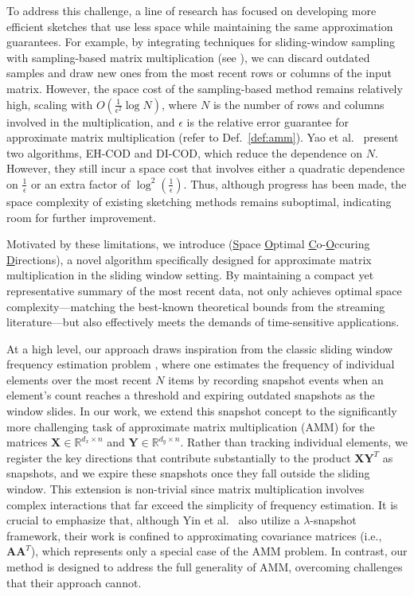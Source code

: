 To address this challenge, a line of research has focused on developing more efficient sketches that use less space while maintaining the same approximation guarantees. For example, by integrating techniques for sliding-window sampling with sampling-based matrix multiplication (see \cite{efraimidis2006weighted, drineas2006fast, babcock2001sampling}), we can discard outdated samples and draw new ones from the most recent rows or columns of the input matrix. However, the space cost of the sampling-based method remains relatively high, scaling with \( O\left(\frac{1}{\epsilon^2} \log N\right) \), where \( N \) is the number of rows and columns involved in the multiplication, and \( \epsilon \) is the relative error guarantee for approximate matrix multiplication (refer to Def.\ \ref{def:amm}). 
Yao et al.~\cite{YaoLCWC24} present two algorithms, EH-COD and DI-COD, which reduce the dependence on \( N \). However, they still incur a space cost that involves either a quadratic dependence on \( \frac{1}{\epsilon} \) or an extra factor of \( \log^2\left(\frac{1}{\epsilon}\right) \).
Thus, although progress has been made, the space complexity of existing sketching methods remains suboptimal, indicating room for further improvement.


Motivated by these limitations, we introduce {\em \oursolution} (\underline{S}pace \underline{O}ptimal \underline{C}o-\underline{O}ccuring \underline{D}irections), a novel algorithm specifically designed for approximate matrix multiplication in the sliding window setting. By maintaining a compact yet representative summary of the most recent data, {\oursolution} not only achieves optimal space complexity—matching the best-known theoretical bounds from the streaming literature—but also effectively meets the demands of time-sensitive applications.


At a high level, our approach draws inspiration from the classic sliding window frequency estimation problem \cite{LeeT06}, where one estimates the frequency of individual elements over the most recent \(N\) items by recording snapshot events when an element’s count reaches a threshold and expiring outdated snapshots as the window slides. In our work, we extend this snapshot concept to the significantly more challenging task of approximate matrix multiplication (AMM) for the matrices \(\boldsymbol{X} \in \mathbb{R}^{d_x \times n}\) and \(\boldsymbol{Y} \in \mathbb{R}^{d_y \times n}\). Rather than tracking individual elements, we register the key directions that contribute substantially to the product \(\boldsymbol{X}\boldsymbol{Y}^T\) as snapshots, and we expire these snapshots once they fall outside the sliding window. This extension is non-trivial since matrix multiplication involves complex interactions that far exceed the simplicity of frequency estimation. It is crucial to emphasize that, although Yin et al.\ \cite{YinWLWZHL24} also utilize a \(\lambda\)-snapshot framework, their work is confined to approximating covariance matrices (i.e., \(\boldsymbol{A}\boldsymbol{A}^T\)), which represents only a special case of the AMM problem. In contrast, our method is designed to address the full generality of AMM, overcoming challenges that their approach cannot.

